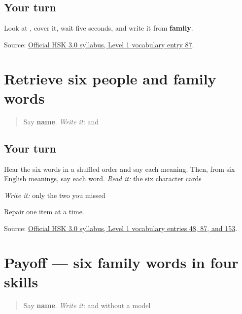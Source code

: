 \subsection*{Your turn}
Look at \textbf{}, cover it, wait five seconds, and write it from \textbf{family}.

\begin{tcolorbox}[breakable,colback=teal!4,colframe=teal!35!black,title={Before you move on}]
Source: \href{https://hsk.cn-bj.ufileos.com/3.0/\%E6\%96\%B0\%E7\%89\%88HSK\%E8\%80\%83\%E8\%AF\%95\%E5\%A4\%A7\%E7\%BA\%B21219.pdf}{Official HSK 3.0 syllabus, Level 1 vocabulary entry 87}.
\end{tcolorbox}
\section[Practice]{Retrieve six people and family words}

\label{lesson:ZH-R12-family-six}



\begin{quote}
Say \textbf{name}. \emph{Write it:}  and 
\end{quote}

\subsection*{Your turn}
Hear the six words in a shuffled order and say each meaning. Then, from six English meanings, say each word. \emph{Read it:} the six character cards

\emph{Write it:} only the two you missed

Repair one item at a time.

\begin{tcolorbox}[breakable,colback=teal!4,colframe=teal!35!black,title={Before you move on}]
Source: \href{https://hsk.cn-bj.ufileos.com/3.0/\%E6\%96\%B0\%E7\%89\%88HSK\%E8\%80\%83\%E8\%AF\%95\%E5\%A4\%A7\%E7\%BA\%B21219.pdf}{Official HSK 3.0 syllabus, Level 1 vocabulary entries 48, 87, and 153}.
\end{tcolorbox}
\section[Practice]{Payoff — six family words in four skills}

\label{lesson:ZH-C12-practice}



\begin{quote}
Say \textbf{name}. \emph{Write it:}  and  without a model
\end{quote}

